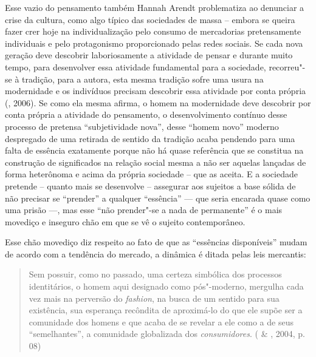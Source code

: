 Esse vazio do pensamento também Hannah Arendt problematiza ao denunciar
a crise da cultura, como algo típico das sociedades de massa -- embora
se queira fazer crer hoje na individualização pelo consumo de
mercadorias pretensamente individuais e pelo protagonismo proporcionado
pelas redes sociais. Se cada nova geração deve descobrir laboriosamente
a atividade de pensar e durante muito tempo, para desenvolver essa
atividade fundamental para a sociedade, recorreu"-se à tradição, para a
autora, esta mesma tradição sofre uma usura na modernidade e os
indivíduos precisam descobrir essa atividade por conta própria (,
2006). Se como ela mesma afirma, o homem na modernidade deve descobrir
por conta própria a atividade do pensamento, o desenvolvimento contínuo
desse processo de pretensa ``subjetividade nova'', desse ``homem novo''
moderno despregado de uma retirada de sentido da tradição acaba pendendo
para uma falta de essência exatamente porque não há quase referência que
se constitua na construção de significados na relação social mesma a não
ser aquelas lançadas de forma heterônoma e acima da própria sociedade --
que as aceita. E a sociedade pretende -- quanto mais se desenvolve --
assegurar aos sujeitos a base sólida de não precisar se ``prender'' a
qualquer ``essência'' --- que seria encarada quase como uma prisão ---,
mas esse ``não prender"-se a nada de permanente'' é o mais movediço e
inseguro chão em que se vê o sujeito contemporâneo.

Esse chão movediço diz respeito ao fato de que as ``essências
disponíveis'' mudam de acordo com a tendência do mercado, a dinâmica é
ditada pelas leis mercantis:

\begin{quote}
Sem possuir, como no passado, uma certeza simbólica dos processos
identitários, o homem aqui designado como pós"-moderno, mergulha cada vez
mais na perversão do \emph{fashion}, na busca de um sentido para sua
existência, sua esperança recôndita de aproximá-lo do que ele supõe ser
a comunidade dos homens e que acaba de se revelar a ele como a de seus
``semelhantes'', a comunidade globalizada dos \emph{consumidores}.
( \& , 2004, p. 08)
\end{quote}

